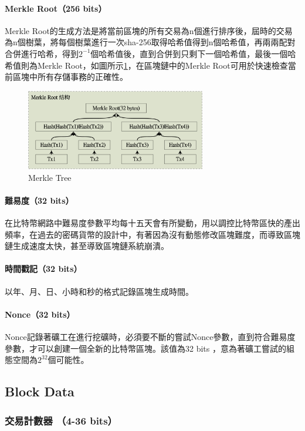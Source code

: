 			\paragraph{Merkle Root（256 bits）}Merkle Root的生成方法是將當前區塊的所有交易為n個進行排序後，屆時的交易為n個樹葉，將每個樹葉進行一次sha-256取得哈希值得到n個哈希值，再兩兩配對合併進行哈希，得到$2^{-1}$個哈希值後，直到合併到只剩下一個哈希值，最後一個哈希值則為Merkle Root，如圖所示\ref{MerkleRoot}，在區塊鏈中的Merkle Root可用於快速檢查當前區塊中所有存儲事務的正確性。

			\begin{figure}[h]
				\centering
				\includegraphics[width = 0.7\textwidth]{MerkleRoot.png}
				\caption{Merkle Tree}\label{MerkleRoot}
			\end{figure}

			
			\paragraph{難易度（32 bits）}在比特幣網路中難易度參數平均每十五天會有所變動，用以調控比特幣區快的產出頻率，在過去的密碼貨幣的設計中，有著因為沒有動態修改區塊難度，而導致區塊鏈生成速度太快，甚至導致區塊鏈系統崩潰。
			\paragraph{時間戳記（32 bits）}以年、月、日、小時和秒的格式記錄區塊生成時間。
			\paragraph{Nonce（32 bits）}Nonce記錄著礦工在進行挖礦時，必須要不斷的嘗試Nonce參數，直到符合難易度參數，才可以創建一個全新的比特幣區塊。該值為32 bits ，意為著礦工嘗試的組態空間為$2^{32}$個可能性。


		\subsection{Block Data}
			\subsubsection{交易計數器 （4-36 bits）}

